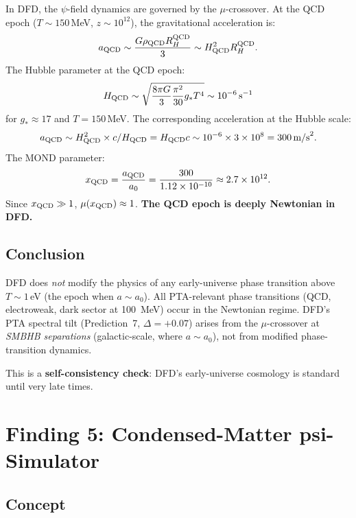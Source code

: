 \documentclass[11pt]{article}
\newcommand{\ee}[1]{\times 10^{#1}}
\begin{document}
In DFD, the $\psi$-field dynamics are governed by the $\mu$-crossover.
At the QCD epoch ($T \sim 150\,$MeV, $z \sim 10^{12}$), the
gravitational acceleration is:
\begin{equation}
a_{\rm QCD} \sim \frac{G \rho_{\rm QCD} R_H^{\rm QCD}}{3}
\sim H_{\rm QCD}^2 R_H^{\rm QCD}.
\end{equation}
The Hubble parameter at the QCD epoch:
\begin{equation}
H_{\rm QCD} \sim \sqrt{\frac{8\pi G}{3}\frac{\pi^2}{30}g_* T^4}
\sim 10^{-6}\,\text{s}^{-1}
\end{equation}
for $g_* \approx 17$ and $T = 150\,$MeV. The corresponding acceleration
at the Hubble scale:
\begin{equation}
a_{\rm QCD} \sim H_{\rm QCD}^2 \times c/H_{\rm QCD} = H_{\rm QCD} c
\sim 10^{-6} \times 3\ee{8} = 300\,\text{m/s}^2.
\end{equation}
The MOND parameter:
\begin{equation}
x_{\rm QCD} = \frac{a_{\rm QCD}}{a_0}
= \frac{300}{1.12\ee{-10}} \approx 2.7\ee{12}.
\end{equation}
Since $x_{\rm QCD} \gg 1$, $\mu(x_{\rm QCD}) \approx 1$.
\textbf{The QCD epoch is deeply Newtonian in DFD.}

\subsection{Conclusion}

DFD does \emph{not} modify the physics of any early-universe phase
transition above $T \sim 1\,$eV (the epoch when $a \sim a_0$). All
PTA-relevant phase transitions (QCD, electroweak, dark sector at
100~MeV) occur in the Newtonian regime. DFD's PTA spectral tilt
(Prediction~7, $\Delta = +0.07$) arises from the $\mu$-crossover
at \emph{SMBHB separations} (galactic-scale, where $a \sim a_0$),
not from modified phase-transition dynamics.

This is a \textbf{self-consistency check}: DFD's early-universe
cosmology is standard until very late times.


\section{Finding 5: Condensed-Matter psi-Simulator}
\label{sec:simulator}

\subsection{Concept}
\end{document}
